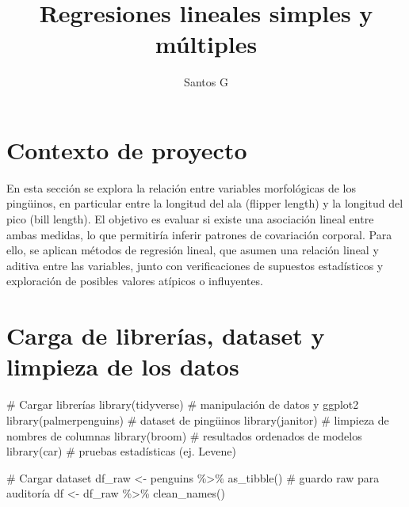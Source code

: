 \documentclass[
  spanish,
  11pt,
  a4paper,
  DIV=11,
  numbers=noendperiod]{scrartcl}
\title{Regresiones lineales simples y múltiples}
\author{Santos G}
\date{}
\newenvironment{Shaded}{\begin{snugshade}}{\end{snugshade}}
\newcommand{\CommentTok}[1]{\textcolor[rgb]{0.37,0.37,0.37}{#1}}
\newcommand{\FunctionTok}[1]{\textcolor[rgb]{0.28,0.35,0.67}{#1}}
\newcommand{\NormalTok}[1]{\textcolor[rgb]{0.00,0.23,0.31}{#1}}
\newcommand{\OtherTok}[1]{\textcolor[rgb]{0.00,0.23,0.31}{#1}}
\newcommand{\SpecialCharTok}[1]{\textcolor[rgb]{0.37,0.37,0.37}{#1}}
\renewcommand*\contentsname{Tabla de contenidos}
\newcommand\contentsname{Tabla de contenidos}
\begin{document}
\maketitle

\renewcommand*\contentsname{Tabla de contenidos}
{
\hypersetup{linkcolor=}
\setcounter{tocdepth}{2}
\tableofcontents
}

\section{Contexto de proyecto}\label{contexto-de-proyecto}

En esta sección se explora la relación entre variables morfológicas de
los pingüinos, en particular entre la longitud del ala (flipper length)
y la longitud del pico (bill length). El objetivo es evaluar si existe
una asociación lineal entre ambas medidas, lo que permitiría inferir
patrones de covariación corporal. Para ello, se aplican métodos de
regresión lineal, que asumen una relación lineal y aditiva entre las
variables, junto con verificaciones de supuestos estadísticos y
exploración de posibles valores atípicos o influyentes.

\section{Carga de librerías, dataset y limpieza de los
datos}\label{carga-de-libreruxedas-dataset-y-limpieza-de-los-datos}

\begin{Shaded}
\begin{Highlighting}[numbers=left,,]
\CommentTok{\# Cargar librerías}
\FunctionTok{library}\NormalTok{(tidyverse)    }\CommentTok{\# manipulación de datos y ggplot2}
\FunctionTok{library}\NormalTok{(palmerpenguins) }\CommentTok{\# dataset de pingüinos}
\FunctionTok{library}\NormalTok{(janitor)      }\CommentTok{\# limpieza de nombres de columnas}
\FunctionTok{library}\NormalTok{(broom)        }\CommentTok{\# resultados ordenados de modelos}
\FunctionTok{library}\NormalTok{(car)          }\CommentTok{\# pruebas estadísticas (ej. Levene)}

\CommentTok{\# Cargar dataset}
\NormalTok{df\_raw }\OtherTok{\textless{}{-}}\NormalTok{ penguins }\SpecialCharTok{\%\textgreater{}\%} \FunctionTok{as\_tibble}\NormalTok{() }\CommentTok{\# guardo raw para auditoría}
\NormalTok{df }\OtherTok{\textless{}{-}}\NormalTok{ df\_raw }\SpecialCharTok{\%\textgreater{}\%} \FunctionTok{clean\_names}\NormalTok{()}
\end{Highlighting}
\end{Shaded}
\end{document}
